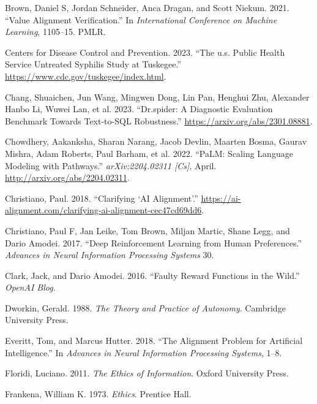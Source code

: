 \documentclass[
  letterpaper,
  numbers=noenddot,
  DIV=11]{scrreprt}
\newlength{\cslhangindent}
\newenvironment{CSLReferences}[2] %
 {\begin{list}{}{%
  \setlength{\itemindent}{0pt}
  \setlength{\leftmargin}{0pt}
  \setlength{\parsep}{0pt}
  \ifodd #1
   \setlength{\leftmargin}{\cslhangindent}
   \setlength{\itemindent}{-1\cslhangindent}
  \fi
  \setlength{\itemsep}{#2\baselineskip}}}
 {\end{list}}
\theoremstyle{definition}
\theoremstyle{plain}
\theoremstyle{plain}
\theoremstyle{remark}
\begin{document}
\begin{CSLReferences}{1}{0}
Brown, Daniel S, Jordan Schneider, Anca Dragan, and Scott Niekum. 2021.
{``Value Alignment Verification.''} In \emph{International Conference on
Machine Learning}, 1105--15. PMLR.

Centers for Disease Control and Prevention. 2023. {``The u.s. Public
Health Service Untreated Syphilis Study at Tuskegee.''}
\url{https://www.cdc.gov/tuskegee/index.html}.

Chang, Shuaichen, Jun Wang, Mingwen Dong, Lin Pan, Henghui Zhu,
Alexander Hanbo Li, Wuwei Lan, et al. 2023. {``Dr.spider: A Diagnostic
Evaluation Benchmark Towards Text-to-SQL Robustness.''}
\url{https://arxiv.org/abs/2301.08881}.

Chowdhery, Aakanksha, Sharan Narang, Jacob Devlin, Maarten Bosma, Gaurav
Mishra, Adam Roberts, Paul Barham, et al. 2022. {``{PaLM}: {Scaling}
{Language} {Modeling} with {Pathways}.''} \emph{arXiv:2204.02311
{[}Cs{]}}, April. \url{http://arxiv.org/abs/2204.02311}.

Christiano, Paul. 2018. {``Clarifying {`AI Alignment'}.''}
\url{https://ai-alignment.com/clarifying-ai-alignment-cec47cd69dd6}.

Christiano, Paul F, Jan Leike, Tom Brown, Miljan Martic, Shane Legg, and
Dario Amodei. 2017. {``Deep Reinforcement Learning from Human
Preferences.''} \emph{Advances in Neural Information Processing Systems}
30.

Clark, Jack, and Dario Amodei. 2016. {``Faulty Reward Functions in the
Wild.''} \emph{OpenAI Blog}.

Dworkin, Gerald. 1988. \emph{The Theory and Practice of Autonomy}.
Cambridge University Press.

Everitt, Tom, and Marcus Hutter. 2018. {``The Alignment Problem for
Artificial Intelligence.''} In \emph{Advances in Neural Information
Processing Systems}, 1--8.

Floridi, Luciano. 2011. \emph{The Ethics of Information}. Oxford
University Press.

Frankena, William K. 1973. \emph{Ethics}. Prentice Hall.


\end{CSLReferences}
\end{document}
